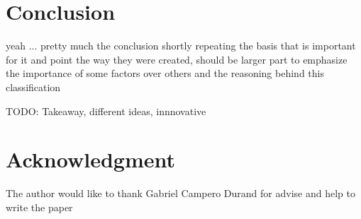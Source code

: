\documentclass[conference]{IEEEtran}
\begin{document}


\section{Conclusion}
yeah ... pretty much the conclusion shortly repeating the basis that is important for it and point the way they were created, should be larger part to emphasize the importance of some factors over others and the reasoning behind this classification
\cite{shi2016benchmarking}

TODO: Takeaway, different ideas, innnovative

\section*{Acknowledgment}
The author would like to thank Gabriel Campero Durand for advise and help to write the paper







\end{document}
